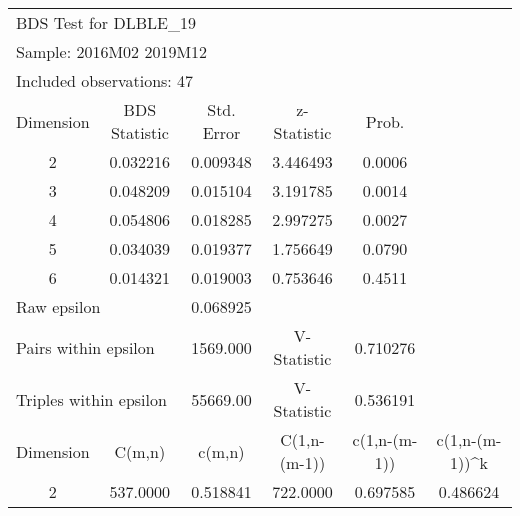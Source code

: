 \begin{tabular}{lrrrrr}
\toprule
\multicolumn{3}{l}{BDS Test for DLBLE\_19}&\multicolumn{1}{c}{}&\multicolumn{1}{c}{}&\multicolumn{1}{c}{}\\
\multicolumn{3}{l}{Sample: 2016M02 2019M12}&\multicolumn{1}{c}{}&\multicolumn{1}{c}{}&\multicolumn{1}{c}{}\\
\multicolumn{3}{l}{Included observations: 47}&\multicolumn{1}{c}{}&\multicolumn{1}{c}{}&\multicolumn{1}{c}{}\\
\midrule
\multicolumn{1}{c}{Dimension}&\multicolumn{1}{c}{BDS Statistic}&\multicolumn{1}{c}{Std. Error}&\multicolumn{1}{c}{z-Statistic}&\multicolumn{1}{c}{Prob.}&\multicolumn{1}{c}{}\\
\multicolumn{1}{c}{2}&\multicolumn{1}{c}{0.032216}&\multicolumn{1}{c}{0.009348}&\multicolumn{1}{c}{3.446493}&\multicolumn{1}{c}{0.0006}&\multicolumn{1}{c}{}\\
\multicolumn{1}{c}{3}&\multicolumn{1}{c}{0.048209}&\multicolumn{1}{c}{0.015104}&\multicolumn{1}{c}{3.191785}&\multicolumn{1}{c}{0.0014}&\multicolumn{1}{c}{}\\
\multicolumn{1}{c}{4}&\multicolumn{1}{c}{0.054806}&\multicolumn{1}{c}{0.018285}&\multicolumn{1}{c}{2.997275}&\multicolumn{1}{c}{0.0027}&\multicolumn{1}{c}{}\\
\multicolumn{1}{c}{5}&\multicolumn{1}{c}{0.034039}&\multicolumn{1}{c}{0.019377}&\multicolumn{1}{c}{1.756649}&\multicolumn{1}{c}{0.0790}&\multicolumn{1}{c}{}\\
\multicolumn{1}{c}{6}&\multicolumn{1}{c}{0.014321}&\multicolumn{1}{c}{0.019003}&\multicolumn{1}{c}{0.753646}&\multicolumn{1}{c}{0.4511}&\multicolumn{1}{c}{}\\
\midrule
\multicolumn{2}{l}{Raw epsilon}&\multicolumn{1}{c}{0.068925}&\multicolumn{1}{c}{}&\multicolumn{1}{c}{}&\multicolumn{1}{c}{}\\
\multicolumn{2}{l}{Pairs within epsilon}&\multicolumn{1}{c}{1569.000}&\multicolumn{1}{c}{V-Statistic}&\multicolumn{1}{c}{0.710276}&\multicolumn{1}{c}{}\\
\multicolumn{2}{l}{Triples within epsilon}&\multicolumn{1}{c}{55669.00}&\multicolumn{1}{c}{V-Statistic}&\multicolumn{1}{c}{0.536191}&\multicolumn{1}{c}{}\\
\midrule
\multicolumn{1}{c}{Dimension}&\multicolumn{1}{c}{C(m,n)}&\multicolumn{1}{c}{c(m,n)}&\multicolumn{1}{c}{C(1,n-(m-1))}&\multicolumn{1}{c}{c(1,n-(m-1))}&\multicolumn{1}{c}{c(1,n-(m-1))\textasciicircum k}\\
\multicolumn{1}{c}{2}&\multicolumn{1}{c}{537.0000}&\multicolumn{1}{c}{0.518841}&\multicolumn{1}{c}{722.0000}&\multicolumn{1}{c}{0.697585}&\multicolumn{1}{c}{0.486624}\\

\end{tabular}

